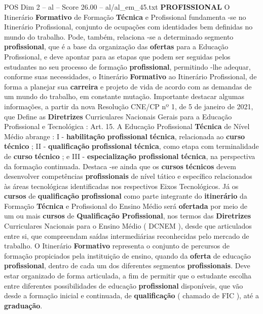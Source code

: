 \begin{textsample}{POS Dim 2 – al – Score 26.00 – al/al\_em\_45.txt}  \label{ex:f2_pos_265}
\textbf{PROFISSIONAL} O Itinerário \textbf{Formativo} de Formação \textbf{Técnica} e Profissional fundamenta -se no Itinerário Profissional, conjunto de ocupações com identidades bem definidas no mundo do trabalho.
Pode, também, relaciona -se a determinado segmento \textbf{profissional}, que é a base da organização das \textbf{ofertas} para a Educação Profissional, e deve apontar para as etapas que podem ser seguidas pelos estudantes no seu processo de formação \textbf{profissional}, permitindo -lhe adequar, conforme suas necessidades, o Itinerário \textbf{Formativo} ao Itinerário Profissional, de forma a planejar sua \textbf{carreira} e projeto de vida de acordo com as demandas de um mundo do trabalho, em constante mutação.
Importante destacar algumas informações, a partir da nova Resolução CNE/CP nº 1, de 5 de janeiro de 2021, que Define as \textbf{Diretrizes} Curriculares Nacionais Gerais para a Educação Profissional e Tecnológica : Art. 15.
A Educação Profissional \textbf{Técnica} de Nível Médio abrange : I - \textbf{habilitação} \textbf{profissional} \textbf{técnica}, relacionada ao \textbf{curso} \textbf{técnico} ; II - \textbf{qualificação} \textbf{profissional} \textbf{técnica}, como etapa com terminalidade de \textbf{curso} \textbf{técnico} ; e III - \textbf{especialização} \textbf{profissional} \textbf{técnica}, na perspectiva da formação continuada.
Destaca -se ainda que os \textbf{cursos} \textbf{técnicos} devem desenvolver competências \textbf{profissionais} de nível tático e específico relacionados às áreas tecnológicas identificadas nos respectivos Eixos Tecnológicos.
Já os \textbf{cursos} de \textbf{qualificação} \textbf{profissional} como parte integrante do \textbf{itinerário} da Formação \textbf{Técnica} e Profissional do Ensino Médio será \textbf{ofertada} por meio de um ou mais \textbf{cursos} de \textbf{Qualificação} \textbf{Profissional}, nos termos das \textbf{Diretrizes} Curriculares Nacionais para o Ensino Médio ( DCNEM ), desde que articulados entre si, que compreendam saídas intermediárias reconhecidas pelo mercado de trabalho.
O Itinerário \textbf{Formativo} representa o conjunto de percursos de formação propiciados pela instituição de ensino, quando da \textbf{oferta} de educação \textbf{profissional}, dentro de cada um dos diferentes segmentos \textbf{profissionais}.
Deve estar organizado de forma articulada, a fim de permitir que o estudante escolha entre diferentes possibilidades de educação \textbf{profissional} disponíveis, que vão desde a formação inicial e continuada, de \textbf{qualificação} ( chamado de FIC ), até a \textbf{graduação}.

\end{textsample}
